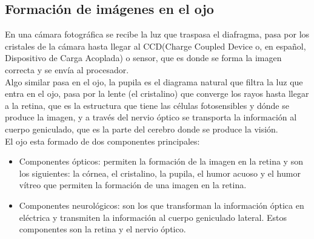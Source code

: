\subsection{Formación de imágenes en el ojo}
En una cámara fotográfica se recibe la luz que traspasa el diafragma, pasa por los cristales de la cámara hasta llegar al CCD(Charge Coupled Device o, en español, Dispositivo de Carga Acoplada) o sensor, que es donde se forma la imagen correcta y se envía al procesador.\\
Algo similar pasa en el ojo, la pupila es el diagrama natural que filtra la luz que entra en el ojo, pasa por la lente (el cristalino)  que converge los rayos hasta llegar a la retina, que es la estructura que tiene las células fotosensibles y dónde se produce la imagen, y a través del nervio óptico se transporta la información al cuerpo geniculado, que es la parte del cerebro donde se produce la visión.\\
El ojo esta formado de dos componentes principales:
\begin{itemize}
\item Componentes ópticos: permiten la formación de la imagen en la retina y son los siguientes: la córnea, el cristalino, la pupila, el humor acuoso y el humor vítreo que permiten la formación de una imagen en la retina.
\item Componentes neurológicos: son los que transforman la información óptica en eléctrica y transmiten la información al cuerpo geniculado lateral. Estos componentes son la retina y el nervio óptico.
\end{itemize}




